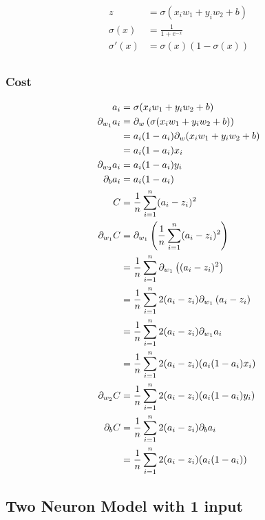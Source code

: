\documentclass{article}
\begin{document}
\begin{align}
	z &= \sigma(x_iw_1 + y_iw_2 + b) \\
	\sigma(x) &= \frac{1}{1 + e^{-x}} \\
	\sigma'(x) &= \sigma(x)(1 - \sigma(x)) \\
\end{align}

\subsubsection{Cost}

\begin{align}
	a_i &= \sigma(x_iw_1 + y_iw_2 + b) \\
	\pd[w_1]a_i 
		&= \pd[w]\left(\sigma(x_iw_1 + y_iw_2 + b)\right) \\
		&= a_i(1 - a_i)\pd[w](x_iw_1 + y_iw_2 + b) \\
		&= a_i(1 - a_i)x_i \\
	\pd[w_2]a_i 
		&= a_i(1 - a_i)y_i \\
	\pd[b]a_i 
		&= a_i(1 - a_i) \\
	C &= \avgsum[i,n](a_i - z_i)^2 \\
	\pd[w_1]C 
		&= \pd[w_1]\left(\avgsum[i,n](a_i - z_i)^2\right) \\
		&= \avgsum[i,n]\pd[w_1]\left((a_i - z_i)^2\right) \\
		&= \avgsum[i,n]2(a_i - z_i)\pd[w_1]\left(a_i - z_i\right) \\
		&= \avgsum[i,n]2(a_i - z_i)\pd[w_1]a_i \\
		&= \avgsum[i,n]2(a_i - z_i)(a_i(1 - a_i)x_i) \\
	\pd[w_2]C 
		&= \avgsum[i,n]2(a_i - z_i)(a_i(1 - a_i)y_i) \\
	\pd[b]C 
		&= \avgsum[i,n]2(a_i - z_i)\pd[b]a_i \\
		&= \avgsum[i,n]2(a_i - z_i)(a_i(1 - a_i)) \\
\end{align}

\subsection{Two Neuron Model with 1 input}

\begin{center}
\end{center}
\end{document}
